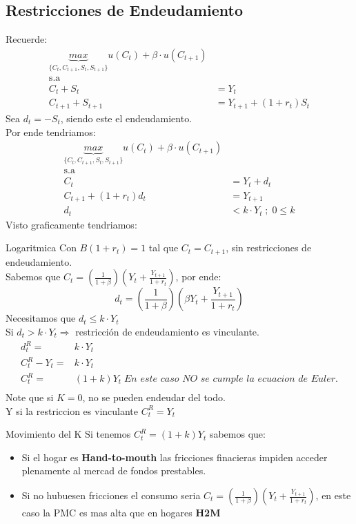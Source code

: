 \documentclass[12pt]{article}
\begin{document}
\subsection{Restricciones de Endeudamiento}
Recuerde: 
\begin{align*}
    \underbrace{max}_{\{ C_t, C_{t+1},S_t,S_{t+1}\}} u(C_t)+\beta\cdot u(C_{t+1}) \\ \text{s.a} \\ C_t+S_t & =Y_t \\  C_{t+1}+S_{t+1} & =Y_{t+1}+(1+r_t)S_t 
\end{align*}
Sea $d_t=-S_t$, siendo este el endeudamiento. \\
Por ende tendriamos: 
\begin{align*}
    \underbrace{max}_{\{ C_t, C_{t+1},S_t,S_{t+1}\}} u(C_t)+\beta\cdot u(C_{t+1}) \\ \text{s.a} \\ C_t & =Y_t+d_t \\  C_{t+1}+(1+r_t)d_t & =Y_{t+1} \\
    d_t&<k \cdot Y_t\; ;\; 0 \leq k 
\end{align*}
Visto graficamente tendriamos: 
\begin{figure} [H]
        \centering
        
        \label{fig:placeholder}
    \end{figure}
\begin{ejemplo}{Logaritmica}
    Con $B(1+r_t)=1$ tal que $C_t=C_{t+1}$, sin restricciones de endeudamiento. \\
    Sabemos que $C_t=(\frac{1}{1+\beta})(Y_t+\frac{Y_{t+1}}{1+r_t})$, por ende: \\
    $$d_t=(\frac{1}{1+\beta})(\beta Y_t+\frac{Y_{t+1}}{1+r_t})$$
    Necesitamos que $d_t\leq k\cdot Y_t$\\
    Si $d_t>k\cdot Y_t \Rightarrow{}$ restricción de endeudamiento es vinculante.
    \begin{align*}
        d_t^R=&k\cdot Y_t \\ C_t^R -Y_t=&k\cdot Y_t\\ C_t^R=&(1+k)Y_t\; \textit{En este caso NO se cumple la ecuacion de Euler.}\\
    \end{align*}
    Note que si $K=0$, no se pueden endeudar del todo.\\
    Y si la restriccion es vinculante $C_t^R=Y_t$
\end{ejemplo}
\begin{comentarioprofe}{Movimiento del K}
Si tenemos $C_t^R=(1+k)Y_t$ sabemos que:
\begin{itemize}
    \item Si el hogar es \textbf{Hand-to-mouth} las fricciones finacieras impiden acceder plenamente al mercad de fondos prestables. 
    \item Si no hubuesen fricciones el consumo seria $C_t=(\frac{1}{1+\beta})(Y_t+\frac{Y_{t+1}}{1+r_t})$, en este caso la PMC es mas alta que en hogares \textbf{H2M}
\end{itemize}
\end{comentarioprofe}
\end{document}
